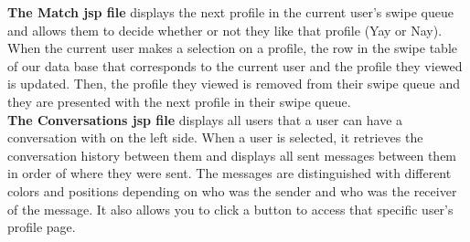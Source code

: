 \documentclass{article}
\begin{document}
\begin{enumerate}
         \textbf{The Match jsp file} displays the next profile in the current user's swipe queue and allows them to decide whether or not they like that profile (Yay or Nay). When the current user makes a selection on a profile, the row in the swipe table of our data base that corresponds to the current user and the profile they viewed is updated. Then, the profile they viewed is removed from their swipe queue and they are presented with the next profile in their swipe queue.\\
        \textbf{The Conversations jsp file} displays all users that a user can have a conversation with on the left side. When a user is selected, it retrieves the conversation history between them and displays all sent messages between them in order of where they were sent. The messages are distinguished with different colors and positions depending on who was the sender and who was the receiver of the message. It also allows you to click a button to access that specific user's profile page. 
    \end{enumerate}
\end{document}
